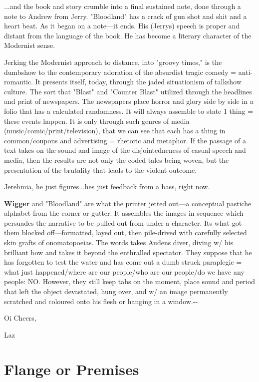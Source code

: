 ...and the book and story crumble into a final sustained note, done
through a note to Andrew from Jerry. "Bloodland" has a crack of gun shot
and shit and a heart beat. As it began on a note---it ends. His (Jerrys)
speech is proper and distant from the language of the book. He has
become a literary character of the Modernist sense.

Jerking the Modernist approach to distance, into "groovy times," is the
dumbshow to the contemporary adoration of the absurdist tragic comedy =
anti-romantic. It presents itself, today, through the jaded situationism
of talkshow culture. The sort that "Blast" and "Counter Blast" utilized
through the headlines and print of newspapers. The newspapers place
horror and glory side by side in a folio that has a calculated
randomness. It will always assemble to state 1 thing = these events
happen. It is only through such genres of media
(music/comic/print/television), that we can see that each has a thing in
common/coupons and advertising = rhetoric and metaphor. If the passage
of a text takes on the sound and image of the disjointedneness of casual
speech and media, then the results are not only the coded tales being
woven, but the presentation of the brutality that leads to the violent
outcome.

Jerehmia, he just figures...hes just feedback from a bass, right now.

\textbf{Wigger} and "Bloodland" are what the printer jetted out---a
conceptual pastiche alphabet from the corner or gutter. It assembles the
images in sequence which persuades the narrative to be pulled out from
under a character. Its what got them blocked off---formatted, layed out,
then pile-drived with carefully selected skin grafts of onomatopoeias.
The words takes Audens diver, diving w/ his brilliant bow and takes it
beyond the enthralled spectator. They suppose that he has forgotten to
test the water and has come out a dumb struck paraplegic = what just
happened/where are our people/who are our people/do we have any people:
NO. However, they still keep tabs on the moment, place sound and period
that left the object devastated, hung over, and w/ an image permanently
scratched and coloured onto his flesh or hanging in a window.-\/-

Oi Cheers,

Laz

\hypertarget{flange-or-premises}{%
\section{Flange or Premises}\label{flange-or-premises}}

